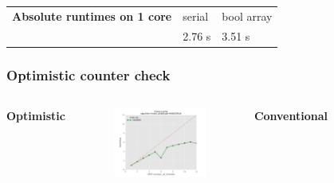 \begin{frame}
\begin{columns}[T]
\begin{figure}[!ht]
\begin{center}
    \end{center}
  \end{figure}  
\end{columns}

\begin{table}
\tiny
\begin{tabular}{lp{1cm}|p{1cm}}
 {\bfseries Absolute runtimes on 1 core}  & serial  & bool array \\
                                          & 2.76 s  & 3.51 s
\end{tabular}
\end{table}

\end{frame}

\begin{frame}
\frametitle{Optimistic counter check}
\begin{columns}[T]
  \bfseries{Optimistic}
  \begin{figure}[!ht]
    \begin{center}
      \includegraphics[width=\textwidth]{img/strongscaling_bitset_gtRANDOMLIN30_opt1.pdf}
    \end{center}
  \end{figure}
  \bfseries{Conventional}
  \begin{figure}[!ht]
    \begin{center}

\end{center}
\end{figure}
\end{columns}
\end{frame}
